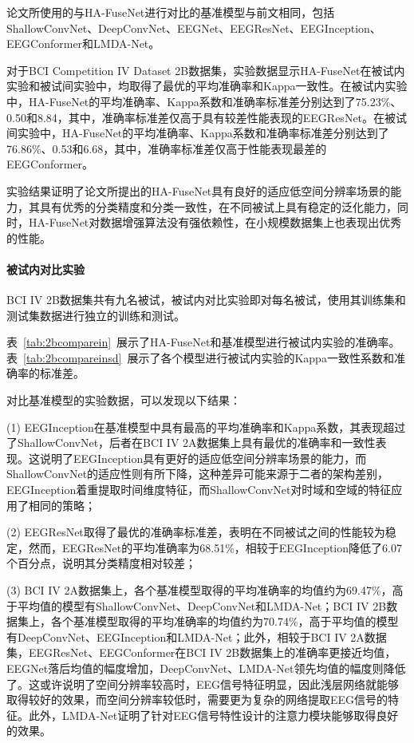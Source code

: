 论文所使用的与HA-FuseNet进行对比的基准模型与前文相同，包括ShallowConvNet\cite{schirrmeister2017deep}、DeepConvNet\cite{schirrmeister2017deep}、EEGNet\cite{lawhern2018eegnet}、EEGResNet\cite{HBM:HBM23730}、EEGInception\cite{zhang2021eeg}、EEGConformer\cite{song2022eeg}和LMDA-Net\cite{miao2023lmda}。

对于BCI Competition IV Dataset 2B数据集，实验数据显示HA-FuseNet在被试内实验和被试间实验中，均取得了最优的平均准确率和Kappa一致性。在被试内实验中，HA-FuseNet的平均准确率、Kappa系数和准确率标准差分别达到了75.23\%、0.50和8.84，其中，准确率标准差仅高于具有较差性能表现的EEGResNet。在被试间实验中，HA-FuseNet的平均准确率、Kappa系数和准确率标准差分别达到了76.86\%、0.53和6.68，其中，准确率标准差仅高于性能表现最差的EEGConformer。

实验结果证明了论文所提出的HA-FuseNet具有良好的适应低空间分辨率场景的能力，其具有优秀的分类精度和分类一致性，在不同被试上具有稳定的泛化能力，同时，HA-FuseNet对数据增强算法没有强依赖性，在小规模数据集上也表现出优秀的性能。

\paragraph{被试内对比实验}

BCI IV 2B数据集共有九名被试，被试内对比实验即对每名被试，使用其训练集和测试集数据进行独立的训练和测试。

表~\ref{tab:2bcomparein}~展示了HA-FuseNet和基准模型进行被试内实验的准确率。表~\ref{tab:2bcompareinsd}~展示了各个模型进行被试内实验的Kappa一致性系数和准确率的标准差。

对比基准模型的实验数据，可以发现以下结果：

(1) EEGInception在基准模型中具有最高的平均准确率和Kappa系数，其表现超过了ShallowConvNet，后者在BCI IV 2A数据集上具有最优的准确率和一致性表现。这说明了EEGInception具有更好的适应低空间分辨率场景的能力，而ShallowConvNet的适应性则有所下降，这种差异可能来源于二者的架构差别，EEGInception着重提取时间维度特征，而ShallowConvNet对时域和空域的特征应用了相同的策略；

(2) EEGResNet取得了最优的准确率标准差，表明在不同被试之间的性能较为稳定，然而，EEGResNet的平均准确率为68.51\%，相较于EEGInception降低了6.07个百分点，说明其分类精度相对较差；

(3) BCI IV 2A数据集上，各个基准模型取得的平均准确率的均值约为69.47\%，高于平均值的模型有ShallowConvNet、DeepConvNet和LMDA-Net；BCI IV 2B数据集上，各个基准模型取得的平均准确率的均值约为70.74\%，高于平均值的模型有DeepConvNet、EEGInception和LMDA-Net；此外，相较于BCI IV 2A数据集，EEGResNet、EEGConformer在BCI IV 2B数据集上的准确率更接近均值，EEGNet落后均值的幅度增加，DeepConvNet、LMDA-Net领先均值的幅度则降低了。这或许说明了空间分辨率较高时，EEG信号特征明显，因此浅层网络就能够取得较好的效果，而空间分辨率较低时，需要更为复杂的网络提取EEG信号的特征。此外，LMDA-Net证明了针对EEG信号特性设计的注意力模块能够取得良好的效果。


